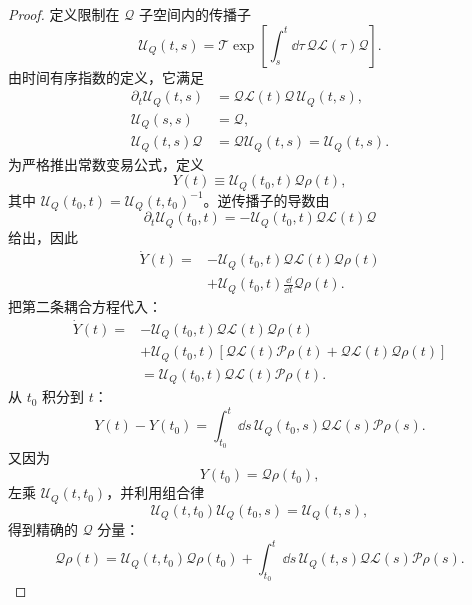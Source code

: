 \begin{proof}
定义限制在 $\mathcal Q$ 子空间内的传播子
\begin{equation*}
 \mathcal U_Q(t,s)
 =\mathcal T\exp\!\left[
 \int_s^t\dd\tau\,
 \mathcal Q\mathcal L(\tau)\mathcal Q
 \right].
\end{equation*}
由时间有序指数的定义，它满足
\begin{align*}
 \partial_t\mathcal U_Q(t,s)
 &=\mathcal Q\mathcal L(t)\mathcal Q\,\mathcal U_Q(t,s),\\
 \mathcal U_Q(s,s)&=\mathcal Q,\\
 \mathcal U_Q(t,s)\mathcal Q
 &=\mathcal Q\mathcal U_Q(t,s)=\mathcal U_Q(t,s).
\end{align*}
为严格推出常数变易公式，定义
\begin{equation*}
 Y(t)\equiv\mathcal U_Q(t_0,t)\mathcal Q\rho(t),
\end{equation*}
其中 $\mathcal U_Q(t_0,t)=\mathcal U_Q(t,t_0)^{-1}$。逆传播子的导数由
\begin{equation*}
 \partial_t\mathcal U_Q(t_0,t)
 =-\mathcal U_Q(t_0,t)\mathcal Q\mathcal L(t)\mathcal Q
\end{equation*}
给出，因此
\begin{align*}
 \dot Y(t)
 ={}&-\mathcal U_Q(t_0,t)
 \mathcal Q\mathcal L(t)\mathcal Q\rho(t)\\
 &+\mathcal U_Q(t_0,t)
 \frac{\dd}{\dd t}\mathcal Q\rho(t).
\end{align*}
把第二条耦合方程代入：
\begin{align*}
 \dot Y(t)
 ={}&-\mathcal U_Q(t_0,t)
 \mathcal Q\mathcal L(t)\mathcal Q\rho(t)\\
 &+\mathcal U_Q(t_0,t)
 \left[
 \mathcal Q\mathcal L(t)\mathcal P\rho(t)
 +\mathcal Q\mathcal L(t)\mathcal Q\rho(t)
 \right]\\
 &=\mathcal U_Q(t_0,t)
 \mathcal Q\mathcal L(t)\mathcal P\rho(t).
\end{align*}
从 $t_0$ 积分到 $t$：
\begin{equation*}
 Y(t)-Y(t_0)
 =\int_{t_0}^{t}\dd s\,
 \mathcal U_Q(t_0,s)
 \mathcal Q\mathcal L(s)\mathcal P\rho(s).
\end{equation*}
又因为
\begin{equation*}
 Y(t_0)=\mathcal Q\rho(t_0),
\end{equation*}
左乘 $\mathcal U_Q(t,t_0)$，并利用组合律
\begin{equation*}
 \mathcal U_Q(t,t_0)\mathcal U_Q(t_0,s)=\mathcal U_Q(t,s),
\end{equation*}
得到精确的 $\mathcal Q$ 分量：
\begin{equation*}
 \mathcal Q\rho(t)
 =\mathcal U_Q(t,t_0)\mathcal Q\rho(t_0)
 +\int_{t_0}^{t}\dd s\,
 \mathcal U_Q(t,s)
 \mathcal Q\mathcal L(s)\mathcal P\rho(s).
\end{equation*}


\end{proof}

